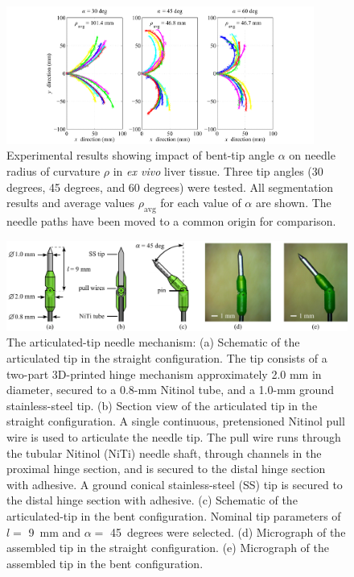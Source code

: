 \begin{figure}[!ht]
\centering
\includegraphics[width=0.9\textwidth]{Images/Chapter3/CurvatureVsAngle/CurvatureVsAngleData}%
\caption[Experimental results showing impact of bent-tip angle $\alpha$]{Experimental results showing impact of bent-tip angle $\alpha$ on needle radius of curvature $\rho$ in \textit{ex vivo} liver tissue. Three tip angles (30 degrees, 45 degrees, and 60 degrees) were tested. All segmentation results and average values $\rho_{\text{avg}}$ for each value of $\alpha$ are shown. The needle paths have been moved to a common origin for comparison.}
\label{fig:CurvatureVsAngleData}
\end{figure}

\begin{figure}[!ht]
\centering
\includegraphics[width=\textwidth]{Images/Chapter3/ArticulatedTipDetail/ArticulatedTipDetail}
\caption[Articulated-tip needle mechanism]{The articulated-tip needle mechanism: (a) Schematic of the articulated tip in the straight configuration. The tip consists of a two-part 3D-printed hinge mechanism approximately 2.0 mm in diameter, secured to a 0.8-mm Nitinol tube, and a 1.0-mm ground stainless-steel tip. (b) Section view of the articulated tip in the straight configuration. A single continuous, pretensioned Nitinol pull wire is used to articulate the needle tip. The pull wire runs through the tubular Nitinol (NiTi) needle shaft, through channels in the proximal hinge section, and is secured to the distal hinge section with adhesive. A ground conical stainless-steel (SS) tip is secured to the distal hinge section with adhesive. (c) Schematic of the articulated-tip in the bent configuration. Nominal tip parameters of $l =$ 9~mm and $\alpha =$ 45~degrees were selected. (d) Micrograph of the assembled tip in the straight configuration. (e) Micrograph of the assembled tip in the bent configuration.}
\label{fig:ArticulatedTipDetail}
\end{figure} 

